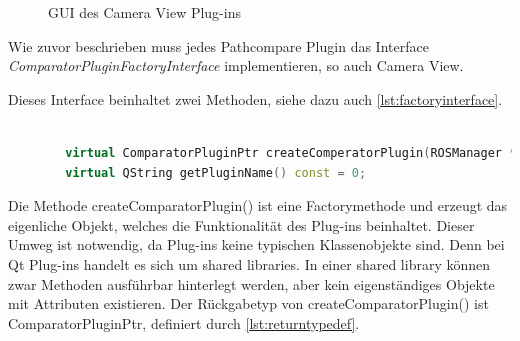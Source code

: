 \begin{figure}[t]
  \begin{center}
  \end{center}
  \caption{GUI des Camera View Plug-ins}
  \label{fig:cameraview}
\end{figure}

Wie zuvor beschrieben muss jedes Pathcompare Plugin das Interface
\textit{ComparatorPluginFactoryInterface} implementieren, so auch Camera View.

Dieses Interface beinhaltet zwei Methoden, siehe dazu auch
\autoref{lst:factoryinterface}.

\begin{lstlisting}[caption=ROS transformation message, language=C++, basicstyle=\footnotesize, label=lst:factoryinterface]

        virtual ComparatorPluginPtr createComperatorPlugin(ROSManager * ros_manager, QWidget *tab_widget) const = 0;
        virtual QString getPluginName() const = 0;

\end{lstlisting}

Die Methode createComparatorPlugin() ist eine Factorymethode und erzeugt das
eigenliche Objekt, welches die Funktionalität des Plug-ins beinhaltet. Dieser
Umweg ist notwendig, da Plug-ins keine typischen Klassenobjekte sind. Denn bei
Qt Plug-ins handelt es sich um shared libraries. In einer shared library können
zwar Methoden ausführbar hinterlegt werden, aber kein eigenständiges Objekte
mit Attributen existieren. Der Rückgabetyp von createComparatorPlugin() ist
ComparatorPluginPtr, definiert durch \autoref{lst:returntypedef}.


